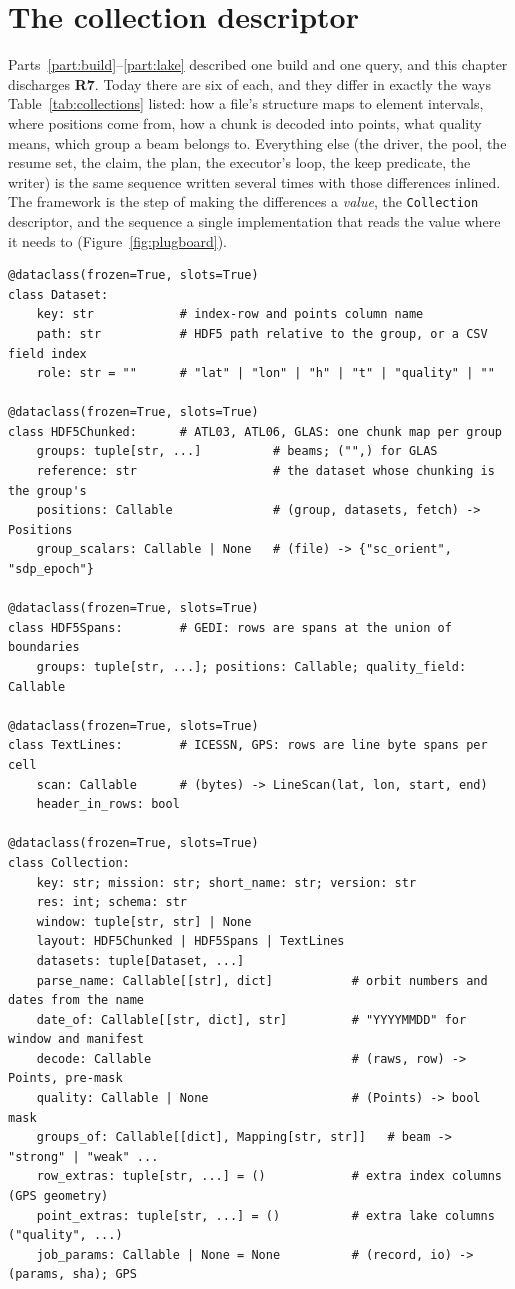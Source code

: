 \documentclass[10pt,a4paper]{article}
\newcommand{\code}[1]{\texttt{#1}}
\newcommand{\req}[1]{\textbf{R#1}}
\begin{document}
\section{The collection descriptor}
\label{ch:descriptor}

Parts~\ref{part:build}--\ref{part:lake} described one build and one query, and this chapter discharges \req{7}. Today there are six of each, and they differ in exactly the
ways Table~\ref{tab:collections} listed: how a file's structure maps to element intervals, where positions come
from, how a chunk is decoded into points, what quality means, which group a beam belongs to. Everything else (the
driver, the pool, the resume set, the claim, the plan, the executor's loop, the keep predicate, the writer) is the
same sequence written several times with those differences inlined. The framework is the step of making the
differences a \emph{value}, the \code{Collection} descriptor, and the sequence a single implementation that reads
the value where it needs to (Figure~\ref{fig:plugboard}).

\begin{lstlisting}
@dataclass(frozen=True, slots=True)
class Dataset:
    key: str            # index-row and points column name
    path: str           # HDF5 path relative to the group, or a CSV field index
    role: str = ""      # "lat" | "lon" | "h" | "t" | "quality" | ""

@dataclass(frozen=True, slots=True)
class HDF5Chunked:      # ATL03, ATL06, GLAS: one chunk map per group
    groups: tuple[str, ...]          # beams; ("",) for GLAS
    reference: str                   # the dataset whose chunking is the group's
    positions: Callable              # (group, datasets, fetch) -> Positions
    group_scalars: Callable | None   # (file) -> {"sc_orient", "sdp_epoch"}

@dataclass(frozen=True, slots=True)
class HDF5Spans:        # GEDI: rows are spans at the union of boundaries
    groups: tuple[str, ...]; positions: Callable; quality_field: Callable

@dataclass(frozen=True, slots=True)
class TextLines:        # ICESSN, GPS: rows are line byte spans per cell
    scan: Callable      # (bytes) -> LineScan(lat, lon, start, end)
    header_in_rows: bool

@dataclass(frozen=True, slots=True)
class Collection:
    key: str; mission: str; short_name: str; version: str
    res: int; schema: str
    window: tuple[str, str] | None
    layout: HDF5Chunked | HDF5Spans | TextLines
    datasets: tuple[Dataset, ...]
    parse_name: Callable[[str], dict]           # orbit numbers and dates from the name
    date_of: Callable[[str, dict], str]         # "YYYYMMDD" for window and manifest
    decode: Callable                            # (raws, row) -> Points, pre-mask
    quality: Callable | None                    # (Points) -> bool mask
    groups_of: Callable[[dict], Mapping[str, str]]   # beam -> "strong" | "weak" ...
    row_extras: tuple[str, ...] = ()            # extra index columns (GPS geometry)
    point_extras: tuple[str, ...] = ()          # extra lake columns ("quality", ...)
    job_params: Callable | None = None          # (record, io) -> (params, sha); GPS
\end{lstlisting}
\end{document}
